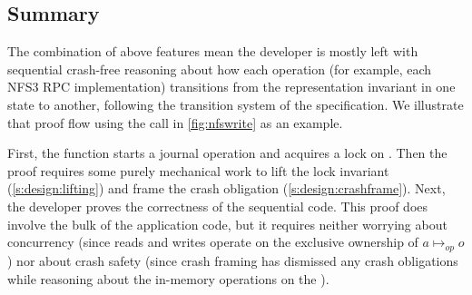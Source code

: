 \subsection{Summary}
\label{s:design:summary}

The combination of above features mean the developer is mostly left with
sequential crash-free reasoning about how each operation (for example, each NFS3 RPC
implementation) transitions from the representation invariant in one state to
another, following the transition system of the specification. We
illustrate that proof flow using the  call in
\autoref{fig:nfswrite} as an example.



First, the function starts a journal operation and acquires a lock on . Then the proof
requires some purely mechanical work to lift the lock invariant
(\autoref{s:design:lifting}) and frame the crash obligation
(\autoref{s:design:crashframe}). Next, the developer proves the correctness of
the sequential code. This proof does involve the bulk of the application code,
but it requires neither worrying about concurrency (since reads and writes
operate on the exclusive ownership of $a \mapsto_{\mathit{op}} o$) nor about crash safety
(since crash framing has dismissed any crash obligations while reasoning
about the in-memory operations on the ).

